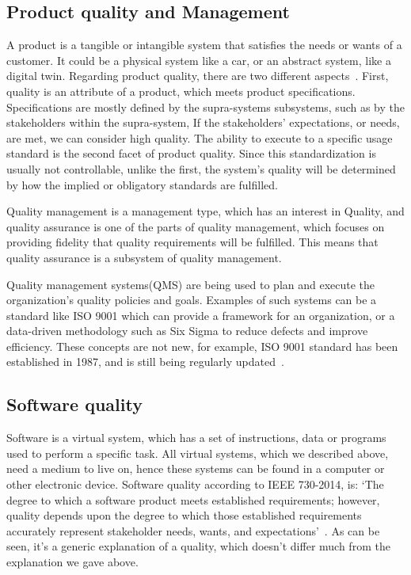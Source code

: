 \documentclass{llncs}
\begin{document}
    \subsection*{Product quality and Management}
    A product is a tangible or intangible system that satisfies the needs or wants of a customer. It could be a physical system like a car, or an abstract system, like a digital twin. 
    Regarding product quality, there are two different aspects~\cite{GrievesPLMBook}.
    First, quality is an attribute of a product, which meets product specifications. Specifications are mostly defined by the supra-systems subsystems, such as by the stakeholders within the supra-system,  If the stakeholders' expectations, or needs, are met, we can consider high quality.
    The ability to execute to a specific usage standard is the second facet of product quality. Since this standardization is usually not controllable, unlike the first, the system's quality will be determined by how the implied or obligatory standards are fulfilled.

    Quality management is a management type, which has an interest in Quality, and quality assurance is one of the parts of quality management, 
    which focuses on providing fidelity that quality requirements will be fulfilled. This means that quality assurance is a subsystem of quality management.

    Quality management systems(QMS) are being used to plan and execute the organization's quality policies and goals. 
    Examples of such systems can be a standard like ISO 9001 which can provide a framework for an organization, or a data-driven methodology 
    such as Six Sigma to reduce defects and improve efficiency. These concepts are not new, for example, ISO 9001 standard has been established in 1987, 
    and is still being regularly updated~\cite{ISO9001DebunkingtheMyth}.

    \subsection*{Software quality}
    Software is a  virtual system, which has a set of instructions, data or programs used to perform a specific task. 
    All virtual systems, which we described above, need a medium to live on, hence these systems can be found in a computer or other electronic device.  
    Software quality according to IEEE 730-2014, is: 
    `The degree to which a software product meets established requirements; however, 
    quality depends upon the degree to which those established requirements accurately represent stakeholder needs, wants, and expectations'~\cite{IEE730-2014}. 
    As can be seen, it's a generic explanation of a quality, which doesn't differ much from the explanation we gave above. 
\end{document}
